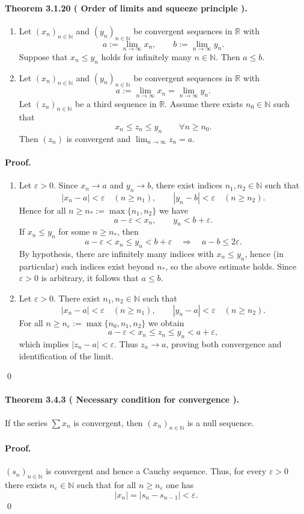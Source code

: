 \documentclass[12pt,a4paper]{article}
\newcommand{\N}{\mathbb{N}}
\newcommand{\R}{\mathbb{R}}
\newcommand{\eps}{\varepsilon}
\newcommand{\NumberedTheorem}[3]{%
\paragraph*{Theorem #1 ( #2 ).} #3\par}
\theoremstyle{plain}
\theoremstyle{definition}
\theoremstyle{remark}
\begin{document}
\NumberedTheorem{3.1.20}{Order of limits and squeeze principle}{
\begin{enumerate}[label={(\arabic*)}, leftmargin=*]
	\item Let $(x_n)_{n\in\N}$ and $(y_n)_{n\in\N}$ be convergent sequences in $\R$ with
	\[
		a := \lim_{n\to\infty} x_n,\qquad b := \lim_{n\to\infty} y_n.
	\]
	Suppose that $x_n\le y_n$ holds for infinitely many $n\in\N$. Then $a\le b$.

	\item Let $(x_n)_{n\in\N}$ and $(y_n)_{n\in\N}$ be convergent sequences in $\R$ with
	\[
		a := \lim_{n\to\infty} x_n = \lim_{n\to\infty} y_n.
	\]
	Let $(z_n)_{n\in\N}$ be a third sequence in $\R$. Assume there exists $n_0\in\N$ such that
	\[
		x_n \le z_n \le y_n \qquad \forall n\ge n_0.
	\]
	Then $(z_n)$ is convergent and $\lim_{n\to\infty} z_n = a$.
\end{enumerate}}

\paragraph{Proof.}
\begin{enumerate}[label={(\arabic*)}, leftmargin=*]
	\item Let $\eps>0$. Since $x_n\to a$ and $y_n\to b$, there exist indices $n_1,n_2\in\N$ such that
	\[
		|x_n-a|<\eps \quad (n\ge n_1), \qquad |y_n-b|<\eps \quad (n\ge n_2).
	\]
	Hence for all $n\ge n_\ast:=\max\{n_1,n_2\}$ we have
	\[
		a-\eps < x_n, \qquad y_n < b+\eps.
	\]
	If $x_n\le y_n$ for some $n\ge n_\ast$, then
	\[
		a-\eps < x_n \le y_n < b+\eps \quad \Longrightarrow \quad a-b \le 2\eps.
	\]
	By hypothesis, there are infinitely many indices with $x_n\le y_n$, hence (in particular) such indices exist beyond $n_\ast$, so the above estimate holds. Since $\eps>0$ is arbitrary, it follows that $a\le b$.

	\item Let $\eps>0$. There exist $n_1,n_2\in\N$ such that
	\[
		|x_n-a|<\eps \quad (n\ge n_1),\qquad |y_n-a|<\eps \quad (n\ge n_2).
	\]
	For all $n\ge n_\eps:=\max\{n_0,n_1,n_2\}$ we obtain
	\[
		a-\eps < x_n \le z_n \le y_n < a+\eps,
	\]
	which implies $|z_n-a|<\eps$. Thus $z_n\to a$, proving both convergence and identification of the limit.
\end{enumerate}
\qed
\NumberedTheorem{3.4.3}{Necessary condition for convergence}{If the series $\sum x_n$ is convergent, then $(x_n)_{n\in\N}$ is a null sequence.}
\paragraph{Proof.}
$(s_n)_{n\in\N}$ is convergent and hence a Cauchy sequence. Thus, for every $\eps>0$ there exists $n_\eps\in\N$ such that for all $n\ge n_\eps$ one has
\[
	|x_n| = |s_n - s_{n-1}| < \eps.
\]
\qed
\end{document}
